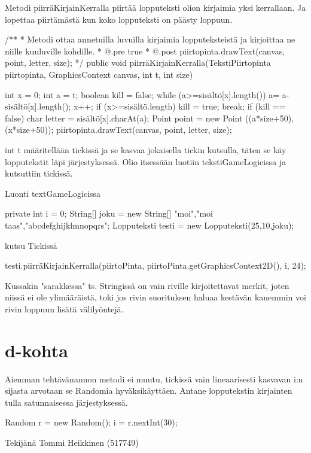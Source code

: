 Metodi piirräKirjainKerralla piirtää lopputeksti olion kirjaimia yksi
kerrallaan. Ja lopettaa piirtämästä kun koko lopputeksti on päästy loppuun.
\begin{javacode}
/**
     * Metodi ottaa annetuilla luvuilla kirjaimia lopputeksteistä ja kirjoittaa
     ne niille kuuluville kohdille.
     * @.pre true
     * @.post piirtopinta.drawText(canvas, point, letter, size);
     */
    public void piirräKirjainKerralla(TekstiPiirtopinta piirtopinta,
    GraphicsContext canvas, int t, int size) { 
      int x = 0;
      int a = t;
      boolean kill = false;
      while (a>=sisältö[x].length()) {
        a= a-sisältö[x].length();
        x++;
        if (x>=sisältö.length) {
          kill = true;
          break;
        }
      }
      if (kill == false) {
        char letter = sisältö[x].charAt(a);
        Point point = new Point ((a*size+50),(x*size+50));
        piirtopinta.drawText(canvas, point, letter, size);
      }
      
    }
\end{javacode}
int t määritellään tickissä ja se kasvaa jokaisella tickin kutsulla, täten se
käy lopputekstit läpi järjestyksessä. Olio itsessään luotiin tekstiGameLogicissa
ja kutsuttiin tickissä.

Luonti textGameLogicissa
\begin{javacode}
  private int i = 0;
    String[] joku = new String[] {"moi","moi taas","abcdefghijklmnopqrs"};
    Lopputeksti testi = new Lopputeksti(25,10,joku);
\end{javacode}

kutsu Tickissä
\begin{javacode}
testi.piirräKirjainKerralla(piirtoPinta, piirtoPinta.getGraphicsContext2D(), i, 24);
\end{javacode}

Kussakin "sarakkessa" ts. Stringissä on vain riville kirjoitettavat merkit,
joten niissä ei ole ylimääräistä, toki jos rivin suorituksen haluaa kestävän
kauemmin voi rivin loppuun lisätä välilyöntejä.
\section{d-kohta}
\label{d-kohta}

Aiemman tehtävänannon metodi ei muutu, tickissä vain lineaarisesti kasvavan i:n
sijasta arvotaan se Randomia hyväksikäyttäen. Antane lopputekstin kirjainten
tulla satunnaisessa järjestyksessä.
\begin{javacode}
  Random r = new Random();
      i = r.nextInt(30);
\end{javacode}



Tekijänä Tommi Heikkinen (517749)
